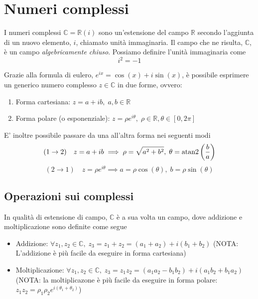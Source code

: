 
\section{Numeri complessi}
    I numeri complessi $\mathbb{C} = \mathbb{R}(i)$ sono un'estensione del campo $\mathbb{R}$ secondo l'aggiunta di un nuovo elemento, $i$, chiamato unità immaginaria.
    Il campo che ne risulta, $\mathbb{C}$, è un campo \textit{algebricamente chiuso}.
    Possiamo definire l'unità immaginaria come
    \[
        i^{2} = -1
    \]

    Grazie alla formula di eulero, $e^{ix} = \cos(x) + i \sin(x)$, è possibile esprimere un generico numero complesso $z \in \mathbb{C}$ in due forme, ovvero:
    \begin{enumerate}
        \item Forma cartesiana: $z = a + ib, \; a, b \in \mathbb{R}$
        \item Forma polare (o esponenziale): $z = \rho e^{i \theta}, \; \rho \in \mathbb{R}, \theta \in [0, 2 \pi]$
    \end{enumerate}
    E' inoltre possibile passare da una all'altra forma nei seguenti modi
    \[
        (1 \rightarrow 2) \quad z = a + ib \implies \rho = \sqrt{a^{2} + b^{2}}, \; \theta = \textnormal{atan2}\left(\frac{b}{a}\right)
    \]
    \[
        (2 \rightarrow 1) \quad z = \rho e^{i \theta} \implies a = \rho \cos(\theta), \; b = \rho \sin(\theta)
    \]



    \subsection{Operazioni sui complessi}
        In qualità di estensione di campo, $\mathbb{C}$ è a sua volta un campo, dove addizione e moltiplicazione sono definite come segue
        \begin{itemize}
            \item Addizione: $\forall z_{1}, z_{2} \in \mathbb{C}, \; z_{3} = z_{1} + z_{2} = (a_{1} + a_{2}) + i(b_{1} + b_{2})$ (NOTA: L'addizione è più facile da eseguire in forma cartesiana)
            \item Moltiplicazione: $\forall z_{1}, z_{2} \in \mathbb{C}, \; z_{3} = z_{1}z_{2} = (a_{1}a_{2} - b_{1}b_{2}) + i(a_{1}b_{2} + b_{1}a_{2})$ (NOTA: la moltiplicazone è più facile da eseguire in forma polare: $z_{1}z_{2} = \rho_{1}\rho_{2}e^{i(\theta_{1} + \theta_{2})}$)
        \end{itemize}




